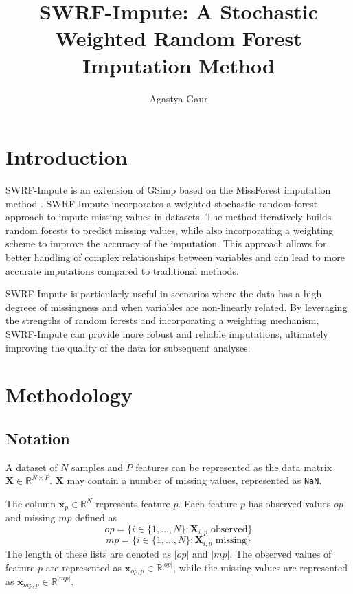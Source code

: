 \documentclass[preprint]{aastex631}
\begin{document}
\title{SWRF-Impute: A Stochastic Weighted Random Forest Imputation Method}
\author{Agastya Gaur}
\noaffiliation

\section{Introduction}

SWRF-Impute is an extension of GSimp \citep{weiGSimpGibbsSampler2018} based on the MissForest imputation method \citep{stekhovenMissForestnonparametricMissingValue2012}. SWRF-Impute incorporates a weighted stochastic random forest approach to impute missing values in datasets. The method iteratively builds random forests to predict missing values, while also incorporating a weighting scheme to improve the accuracy of the imputation. This approach allows for better handling of complex relationships between variables and can lead to more accurate imputations compared to traditional methods.

SWRF-Impute is particularly useful in scenarios where the data has a high degreee of missingness and when variables are non-linearly related. By leveraging the strengths of random forests and incorporating a weighting mechanism, SWRF-Impute can provide more robust and reliable imputations, ultimately improving the quality of the data for subsequent analyses.

\section{Methodology}

\subsection{Notation}
A dataset of $N$ samples and $P$ features can be represented as the data matrix $\mathbf{X} \in \mathbb{R}^{N \times P}$. $\mathbf{X}$ may contain a number of missing values, represented as \verb|NaN|.

The column $\mathbf{x}_p \in \mathbb{R}^N$ represents feature $p$. Each feature $p$ has observed values $op$ and missing $mp$ defined as
\begin{equation}
  op = \{i \in \{1,\dots,N\} : \mathbf{X}_{i,p} \text{ observed} \}
\end{equation}
\begin{equation}
  mp = \{i \in \{1,\dots,N\} : \mathbf{X}_{i,p} \text{ missing} \}
\end{equation}
The length of these lists are denoted as $|op|$ and $|mp|$. The observed values of feature $p$ are represented as $\mathbf{x}_{op,p} \in \mathbb{R}^{|op|}$, while the missing values are represented as $\mathbf{x}_{mp,p} \in \mathbb{R}^{|mp|}$.
\end{document}
